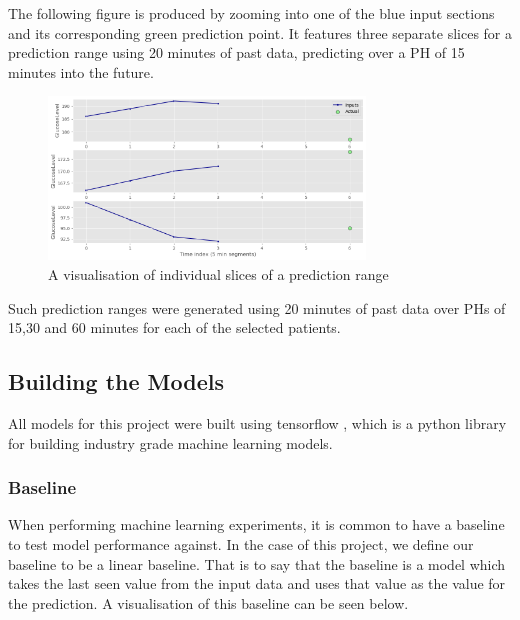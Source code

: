           The following figure is produced by zooming into one of the blue input sections and its corresponding green prediction point. It features three separate slices for a prediction range using 20 minutes of past data, predicting over a PH of 15 minutes into the future.

          \begin{figure}[H]
            \centering

            \includegraphics[width=0.75\textwidth]{images/InsulinSlices.png} 
            \caption{
             A visualisation of individual slices of a prediction range
            }
          \end{figure}

          Such prediction ranges were generated using 20 minutes of past data over PHs of 15,30 and 60 minutes for each of the selected patients.
          
      \subsection{Building the Models}
          
          All models for this project were built using tensorflow \cite{tensorflow}, which is a python library for building industry grade machine learning models.

      \subsubsection{Baseline}
          
          When performing machine learning experiments, it is common to have a baseline to test model performance against. In the case of this project, we define our baseline to be a linear baseline. That is to say that the baseline is a model which takes the last seen value from the input data and uses that value as the value for the prediction. A visualisation of this baseline can be seen below.

